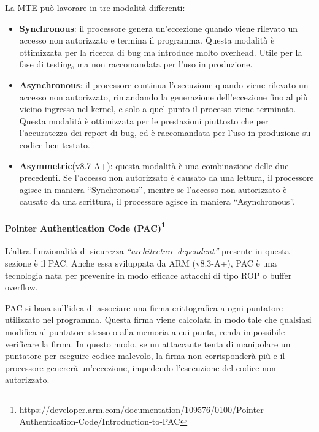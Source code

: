\bigskip
La MTE può lavorare in tre modalità differenti:
\begin{itemize}
  \item \textbf{Synchronous}: il processore genera un'eccezione quando viene rilevato
    un accesso non autorizzato e termina il programma. Questa modalità è
    ottimizzata per la ricerca di bug ma introduce molto overhead. Utile per la fase
    di testing, ma non raccomandata per l'uso in produzione.

  \item \textbf{Asynchronous}: il processore continua l'esecuzione quando viene rilevato
    un accesso non autorizzato, rimandando la generazione dell'eccezione fino al
    più vicino ingresso nel kernel, e solo a quel punto il processo viene terminato.
    Questa modalità è ottimizzata per le prestazioni piuttosto che per l'accuratezza
    dei report di bug, ed è raccomandata per l'uso in produzione su codice ben testato.

  \item \textbf{Asymmetric}(v8.7-A+): questa modalità è una combinazione delle
    due precedenti. Se l'accesso non autorizzato è causato da una lettura, il
    processore agisce in maniera ``Synchronous'', mentre se l'accesso non autorizzato
    è causato da una scrittura, il processore agisce in maniera ``Asynchronous''.
\end{itemize}

\paragraph{Pointer Authentication Code (PAC)\protect\footnote{https://developer.arm.com/documentation/109576/0100/Pointer-Authentication-Code/Introduction-to-PAC}}
L'altra funzionalità di sicurezza \textit{``architecture-dependent''} presente
in questa sezione è il PAC. Anche essa sviluppata da ARM (v8.3-A+), PAC è una
tecnologia nata per prevenire in modo efficace attacchi di tipo ROP o buffer
overflow.

PAC si basa sull'idea di associare una firma crittografica a ogni puntatore
utilizzato nel programma. Questa firma viene calcolata in modo tale che qualsiasi
modifica al puntatore stesso o alla memoria a cui punta, renda impossibile
verificare la firma. In questo modo, se un attaccante tenta di manipolare un
puntatore per eseguire codice malevolo, la firma non corrisponderà più e il processore
genererà un'eccezione, impedendo l'esecuzione del codice non autorizzato.


